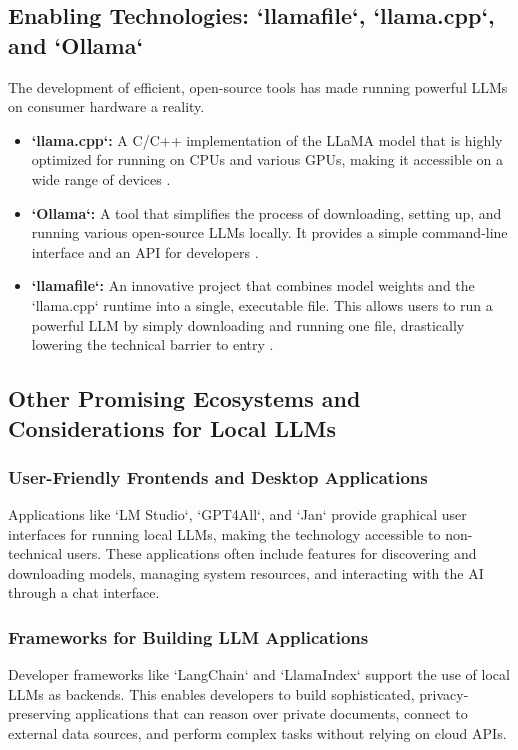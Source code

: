 \subsection{Enabling Technologies: `llamafile`, `llama.cpp`, and `Ollama`}\label{ch9:ssec:local-llm-tech}
The development of efficient, open-source tools has made running powerful LLMs on consumer hardware a reality.
\begin{itemize}
	\item \textbf{`llama.cpp`:} A C/C++ implementation of the LLaMA model that is highly optimized for running on CPUs and various GPUs, making it accessible on a wide range of devices \supercite{LlamaCpp}.
	\item \textbf{`Ollama`:} A tool that simplifies the process of downloading, setting up, and running various open-source LLMs locally. It provides a simple command-line interface and an API for developers \supercite{Ollama}.
	\item \textbf{`llamafile`:} An innovative project that combines model weights and the `llama.cpp` runtime into a single, executable file. This allows users to run a powerful LLM by simply downloading and running one file, drastically lowering the technical barrier to entry \supercite{Llamafile}.
\end{itemize}

\subsection{Other Promising Ecosystems and Considerations for Local LLMs}\label{ch9:ssec:local-llm-ecosystems}

\subsubsection{User-Friendly Frontends and Desktop Applications}\label{ch9:sssec:local-llm-frontends}
Applications like `LM Studio`, `GPT4All`, and `Jan` provide graphical user interfaces for running local LLMs, making the technology accessible to non-technical users. These applications often include features for discovering and downloading models, managing system resources, and interacting with the AI through a chat interface.

\subsubsection{Frameworks for Building LLM Applications}\label{ch9:sssec:local-llm-frameworks}
Developer frameworks like `LangChain` and `LlamaIndex` support the use of local LLMs as backends. This enables developers to build sophisticated, privacy-preserving applications that can reason over private documents, connect to external data sources, and perform complex tasks without relying on cloud APIs.

